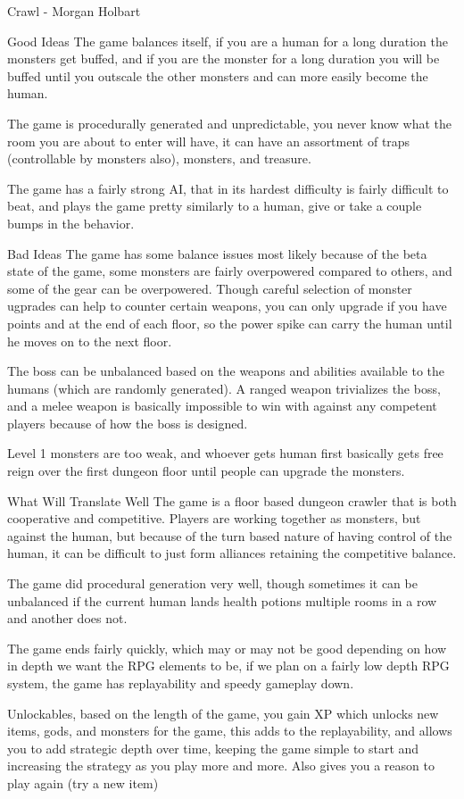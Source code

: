 \documentclass[12pt]{report}
\begin{document}
\begin{section}{Crawl - Morgan Holbart}
\begin{subsection}{Good Ideas}
The game balances itself, if you are a human for a long duration the monsters get buffed, and if you are the monster
for a long duration you will be buffed until you outscale the other monsters and can more easily become the human.

The game is procedurally generated and unpredictable, you never know what the room you are about to enter will have,
it can have an assortment of traps (controllable by monsters also), monsters, and treasure.

The game has a fairly strong AI, that in its hardest difficulty is fairly difficult to beat, and plays the game 
pretty similarly to a human, give or take a couple bumps in the behavior.
\end{subsection}

\begin{subsection}{Bad Ideas}
The game has some balance issues most likely because of the beta state of the game, some monsters are fairly 
overpowered compared to others, and some of the gear can be overpowered. Though careful selection of monster
ugprades can help to counter certain weapons, you can only upgrade if you have points and at the end of each floor,
so the power spike can carry the human until he moves on to the next floor.

The boss can be unbalanced based on the weapons and abilities available to the humans (which are randomly generated).
A ranged weapon trivializes the boss, and a melee weapon is basically impossible to win with against any competent
players because of how the boss is designed.

Level 1 monsters are too weak, and whoever gets human first basically gets free reign over the first dungeon floor 
until people can upgrade the monsters.
\end{subsection}

\begin{subsection}{What Will Translate Well}
The game is a floor based dungeon crawler that is both cooperative and competitive. Players are working together 
as monsters, but against the human, but because of the turn based nature of having control of the human, it
can be difficult to just form alliances retaining the competitive balance. 

The game did procedural generation very well, though sometimes it can be unbalanced if the current human lands 
health potions multiple rooms in a row and another does not.

The game ends fairly quickly, which may or may not be good depending on how in depth we want the RPG elements to be,
if we plan on a fairly low depth RPG system, the game has replayability and speedy gameplay down.

Unlockables, based on the length of the game, you gain XP which unlocks new items, gods, and monsters for the game,
this adds to the replayability, and allows you to add strategic depth over time, keeping the game simple to start
and increasing the strategy as you play more and more. Also gives you a reason to play again (try a new item)
\end{subsection}
\end{section}
\end{document}
